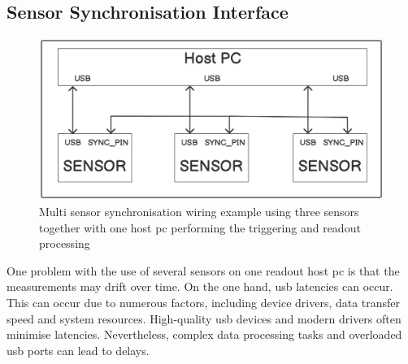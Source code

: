 \hypertarget{sensor-synchronisation-interface}{%
\subsection{Sensor Synchronisation
Interface}\label{sensor-synchronisation-interface}}

\begin{figure}
\centering
\includegraphics{./generated_images/border_Multi_sensor_synchronisation_wiring_example_using_three_sensors_together_with_one_host_(+pc)_performing_the_triggering_and_readout_processing.png}
\caption{Multi sensor synchronisation wiring example using three sensors
together with one host \gls{pc} performing the triggering and readout
processing
\label{Multi_sensor_synchronisation_wiring_example_using_three_sensors_together_with_one_host_(+pc)_performing_the_triggering_and_readout_processing.png}}
\end{figure}

One problem with the use of several sensors on one readout host \gls{pc}
is that the measurements may drift over time. On the one hand, \gls{usb}
latencies can occur. This can occur due to numerous factors, including
device drivers, data transfer speed and system resources. High-quality
\gls{usb} devices and modern drivers often minimise
latencies. Nevertheless, complex data processing tasks and
overloaded \gls{usb} ports can lead to delays.

